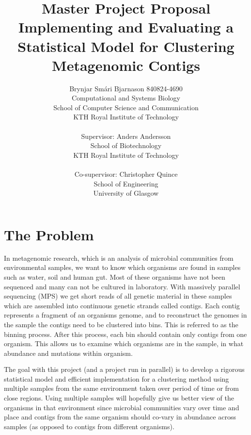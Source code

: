 \documentclass{article}
\begin{document}
\title {\onehalfspacing Master Project Proposal \\ \singlespacing Implementing and Evaluating a Statistical Model for Clustering Metagenomic Contigs}
\author{Brynjar Smári Bjarnason 840824-4690\\Computational and Systems Biology\\ School of Computer Science and Communication\\KTH Royal Institute of Technology \\ \\ 
        Supervisor: Anders Andersson\\School of Biotechnology \\ KTH Royal Institute of Technology\\ \\
        Co-supervisor: Christopher Quince\\School of Engineering\\University of Glasgow}

\maketitle

\section*{The Problem}
In metagenomic research, which is an analysis of microbial communities from environmental samples, we want to know which organisms are found in samples such as water, soil and human gut. Most of these organisms have not been sequenced and many can not be cultured in laboratory. With massively parallel sequencing (MPS) we get short reads of all genetic material in these samples which are assembled into continuous genetic strands called contigs. Each contig represents a fragment of an organisms genome, and to reconstruct the genomes in the sample the contigs need to be clustered into bins. This is referred to as the binning process. After this process, each bin should contain only contigs from one organism. This allows us to examine which organisms are in the sample, in what abundance and mutations within organism.

The goal with this project (and a project run in parallel) is to develop a rigorous statistical model and efficient implementation for a clustering method using multiple samples from the same environment taken over period of time or from close regions. Using multiple samples will hopefully give us better view of the organisms in that environment since microbial communities vary over time and place and contigs from the same organism should co-vary in abundance across samples (as opposed to contigs from different organisms). 
\end{document}
